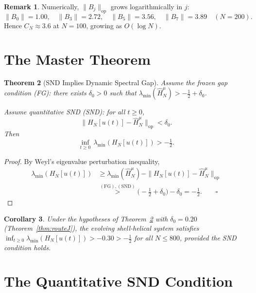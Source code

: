 \documentclass[12pt]{amsart}
\newtheorem{theorem}{Theorem}[section]
\newtheorem{corollary}[theorem]{Corollary}
\theoremstyle{definition}
\newtheorem{remark}[theorem]{Remark}
\newcommand{\HN}{\widehat{H}_N^\mu}
\newcommand{\lmin}{\lambda_{\min}}
\begin{document}
\begin{remark}
Numerically, $\|B_j\|_{\mathrm{op}}$ grows logarithmically in $j$:
\[
\|B_0\|=1.00,\quad\|B_3\|=2.72,\quad\|B_5\|=3.56,\quad\|B_7\|=3.89
\quad(N=200).
\]
Hence $C_N\approx3.6$ at $N=100$, growing as $O(\log N)$.
\end{remark}

\section{The Master Theorem}
\label{sec:master}

\begin{tcolorbox}[provedbox]
\begin{theorem}[SND Implies Dynamic Spectral Gap]
\label{thm:snd-master}
Assume the frozen gap condition \textup{(FG)}: there exists $\delta_0>0$
such that $\lmin(\HN)>-\tfrac{1}{2}+\delta_0$.

Assume quantitative SND \textup{(SND)}: for all $t\ge0$,
\[
\|H_N[u(t)]-\HN\|_{\mathrm{op}} < \delta_0.
\]
Then
\[
\inf_{t\ge0}\,\lmin(H_N[u(t)]) > -\tfrac{1}{2}.
\]
\end{theorem}

\begin{proof}
By Weyl's eigenvalue perturbation inequality,
\begin{align*}
\lmin(H_N[u(t)])
&\ge \lmin(\HN) - \|H_N[u(t)]-\HN\|_{\mathrm{op}} \\
&\overset{\mathrm{(FG),(SND)}}{>}
  \bigl(-\tfrac{1}{2}+\delta_0\bigr) - \delta_0
  = -\tfrac{1}{2}.\qquad\square
\end{align*}
\end{proof}
\end{tcolorbox}

\begin{corollary}
Under the hypotheses of Theorem~\ref{thm:snd-master} with
$\delta_0=0.20$ (Theorem~\ref{thm:routeJ}), the evolving
shell-helical system satisfies
$\inf_{t\ge0}\lmin(H_N[u(t)])>-0.30>-\tfrac{1}{2}$
for all $N\le 800$, provided the SND condition holds.
\end{corollary}

\section{The Quantitative SND Condition}
\label{sec:snd}
\end{document}
